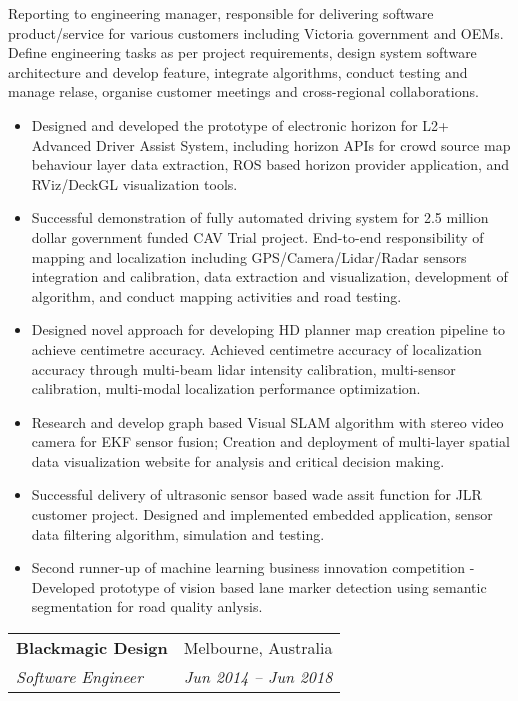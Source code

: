 \documentclass[letterpaper,11pt]{article}
\makeatletter
\newcommand{\resumeItemNoBullet}[4]{
  \vspace{-1pt}
    \begin{tabular*}{0.97\textwidth}{l@{\extracolsep{\fill}}r}
      \textbf{#1} & #2 \\
      \textit{\small#3} & \textit{\small #4} \\
    \end{tabular*}\vspace{-7pt}
}
\newcommand{\resumeSubHeadingListStart}{\begin{itemize}[leftmargin=*]}
\newcommand{\resumeSubHeadingListEnd}{\end{itemize}}
\makeatother
\begin{document}
\vspace{10pt}
{Reporting to engineering manager, responsible for delivering software product/service for various customers including Victoria government and OEMs. Define engineering tasks as per project requirements, design system software architecture and develop feature, integrate algorithms, conduct testing and manage relase, organise customer meetings and cross-regional collaborations. }
  \resumeSubHeadingListStart
    \item Designed and developed the prototype of electronic horizon for L2+ Advanced Driver Assist System, including horizon APIs for crowd source map behaviour layer data extraction, ROS based horizon provider application, and RViz/DeckGL visualization tools.
    \item Successful demonstration of fully automated driving system for 2.5 million dollar government funded CAV Trial project. End-to-end responsibility of mapping and localization including GPS/Camera/Lidar/Radar sensors integration and calibration, data extraction and visualization, development of algorithm, and conduct mapping activities and road testing.
    \item Designed novel approach for developing HD planner map creation pipeline to achieve centimetre accuracy. Achieved centimetre accuracy of localization accuracy through multi-beam lidar intensity calibration, multi-sensor calibration, multi-modal localization performance optimization.
    \item Research and develop graph based Visual SLAM algorithm with stereo video camera for EKF sensor fusion; Creation and deployment of multi-layer spatial data visualization website for analysis and critical decision making.
    \item Successful delivery of ultrasonic sensor based wade assit function for JLR customer project. Designed and implemented embedded application, sensor data filtering algorithm, simulation and testing.  
    \item Second runner-up of machine learning business innovation competition - Developed prototype of vision based lane marker detection using semantic segmentation for road quality anlysis.
  \resumeSubHeadingListEnd

\resumeItemNoBullet
{Blackmagic Design}{Melbourne, Australia}
{Software Engineer}{Jun 2014 -- Jun 2018}
\end{document}
